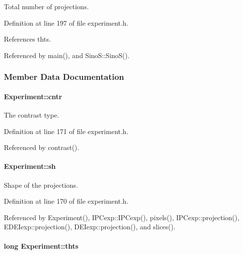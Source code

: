 Total number of projections. 



Definition at line 197 of file experiment.h.



References thts.



Referenced by main(), and SinoS::SinoS().



\subsubsection{Member Data Documentation}
\hypertarget{classExperiment_a33681f3d1524923e4936daed9ac4bac4}{
\paragraph[{cntr}]{ {\bf Experiment::cntr}}\hfill}
\label{classExperiment_a33681f3d1524923e4936daed9ac4bac4}


The contrast type. 



Definition at line 171 of file experiment.h.



Referenced by contrast().

\hypertarget{classExperiment_a49f72b0d8d927296de2e048221a87e85}{
\paragraph[{sh}]{ {\bf Experiment::sh}}\hfill}
\label{classExperiment_a49f72b0d8d927296de2e048221a87e85}


Shape of the projections. 



Definition at line 170 of file experiment.h.



Referenced by Experiment(), IPCexp::IPCexp(), pixels(), IPCexp::projection(), EDEIexp::projection(), DEIexp::projection(), and slices().

\hypertarget{classExperiment_a70638a31b46407c2d58ca5c7055e6db4}{
\paragraph[{thts}]{\setlength{\rightskip}{0pt plus 5cm}long {\bf Experiment::thts}}\hfill}
\label{classExperiment_a70638a31b46407c2d58ca5c7055e6db4}


